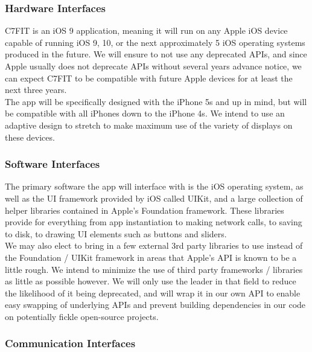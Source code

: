 \documentclass[letterpaper,10pt,titlepage]{article}
\begin{document}
\subsubsection{Hardware Interfaces}

C7FIT is an iOS 9 application, meaning it will run on any Apple iOS device capable of running iOS 9, 10, or the next approximately 5 iOS operating systems produced in the future. We will ensure to not use any deprecated APIs, and since Apple usually does not deprecate APIs without several years advance notice, we can expect C7FIT to be compatible with future Apple devices for at least the next three years.\\

The app will be specifically designed with the iPhone 5s and up in mind, but will be compatible with all iPhones down to the iPhone 4s. We intend to use an adaptive design to stretch to make maximum use of the variety of displays on these devices.\\

\subsubsection{Software Interfaces}

The primary software the app will interface with is the iOS operating system, as well as the UI framework provided by iOS called UIKit, and a large collection of helper libraries contained in Apple’s Foundation framework. These libraries provide for everything from app instantiation to making network calls, to saving to disk, to drawing UI elements such as buttons and sliders.\\

We may also elect to bring in a few external 3rd party libraries to use instead of the Foundation / UIKit framework in areas that Apple’s API is known to be a little rough. We intend to minimize the use of third party frameworks / libraries as little as possible however. We will only use the leader in that field to reduce the likelihood of it being deprecated, and will wrap it in our own API to enable easy swapping of underlying APIs and prevent building dependencies in our code on potentially fickle open-source projects.\\

\subsubsection{Communication Interfaces}
\end{document}

